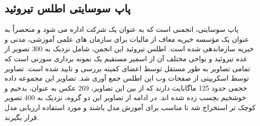 \subsection{پاپ سوسایتی اطلس تیروئید}\label{subsec:پاپ-سوسایتی}
پاپ سوسایتی، انجمنی است که به عنوان یک شرکت اداره می شود و منحصراً به عنوان یک مؤسسه خیریه معاف از مالیات برای سازمان های علمی آموزشی، مدنی و خیریه سازماندهی شده است.
اطلس تیروئید این انجمن\cite{papsocietyiamgeatlas}، شامل نزدیک به 300 تصویر از غده تیروئید و نواحی مختلف آن از اسمیر مستقیم یک نمونه برداری سوزنی است که تمامی تصاویر به طور مستقل توسط اعضای کمیته بررسی و تایید شده است.
تصاویر توسط اسکریپتی از صفحات وب این اطلس جمع آوری شد. تصاویر این مجموعه داده حجمی حدود 125 ماگابایت دارند که از بین این تصاویر، 269 عکس به عنوان، بدخیم و خوشخیم بچسب زده شده اند. در ادامه از تصاویر این دو گروه، نزدیک به 400 تصویر کوچک تر استخراج شد تا مناسب برای آموزش مدل باشند و مورد استفاده ارزیابی مدل قرار بگیرند. 